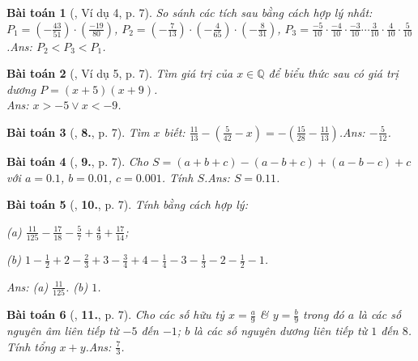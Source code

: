 \documentclass{article}
\numberwithin{equation}{section}
\newtheorem{baitoan}{Bài toán}
\begin{document}
\begin{baitoan}[\cite{Tuyen_Toan_7}, Ví dụ 4, p. 7]
	So sánh các tích sau bằng cách hợp lý nhất: $P_1 = \left(-\frac{43}{51}\right)\cdot\left(\frac{-19}{80}\right)$, $P_2 = \left(-\frac{7}{13}\right)\cdot\left(-\frac{4}{65}\right)\cdot\left(-\frac{8}{31}\right)$, $P_3 = \frac{-5}{10}\cdot\frac{-4}{10}\cdot\frac{-3}{10}\cdots\frac{3}{10}\cdot\frac{4}{10}\cdot\frac{5}{10}$.\hfill\textsf{Ans:} $P_2 < P_3 < P_1$.
\end{baitoan}

\begin{baitoan}[\cite{Tuyen_Toan_7}, Ví dụ 5, p. 7]
	Tìm giá trị của $x\in\mathbb{Q}$ để biểu thức sau có giá trị dương  $P = (x + 5)(x + 9)$.\\\mbox{}\hfill\textsf{Ans:} $x > -5\lor x < -9$.
\end{baitoan}

\begin{baitoan}[\cite{Tuyen_Toan_7}, \textbf{8.}, p. 7]
	Tìm $x$ biết: $\frac{11}{13} - \left(\frac{5}{42} - x\right) = -\left(\frac{15}{28} - \frac{11}{13}\right)$.\hfill\textsf{Ans:} $-\frac{5}{12}$.
\end{baitoan}

\begin{baitoan}[\cite{Tuyen_Toan_7}, \textbf{9.}, p. 7]
	Cho $S = (a + b + c) - (a - b + c) + (a - b - c) + c$ với $a = 0.1$, $b = 0.01$, $c = 0.001$. Tính $S$.\hfill\textsf{Ans:} $S = 0.11$.
\end{baitoan}

\begin{baitoan}[\cite{Tuyen_Toan_7}, \textbf{10.}, p. 7]
	Tính bằng cách hợp lý:\\
	\begin{enumerate*}
		\item[(a)] $\frac{11}{125} - \frac{17}{18} - \frac{5}{7} + \frac{4}{9} + \frac{17}{14}$;
		\item[(b)] $1 - \frac{1}{2} + 2 - \frac{2}{3} + 3 - \frac{3}{4} + 4 - \frac{1}{4} - 3 - \frac{1}{3} - 2 - \frac{1}{2} - 1$.
	\end{enumerate*}\hfill\textsf{Ans:} (a) $\frac{11}{125}$. (b) $1$.
\end{baitoan}

\begin{baitoan}[\cite{Tuyen_Toan_7}, \textbf{11.}, p. 7]
	Cho các số hữu tỷ $x = \frac{a}{9}$ \& $y = \frac{b}{9}$ trong đó $a$ là các số nguyên âm liên tiếp từ $-5$ đến $-1$; $b$ là các số nguyên dương liên tiếp từ $1$ đến $8$. Tính tổng $x + y$.\hfill\textsf{Ans:} $\frac{7}{3}$.
\end{baitoan}
\end{document}
